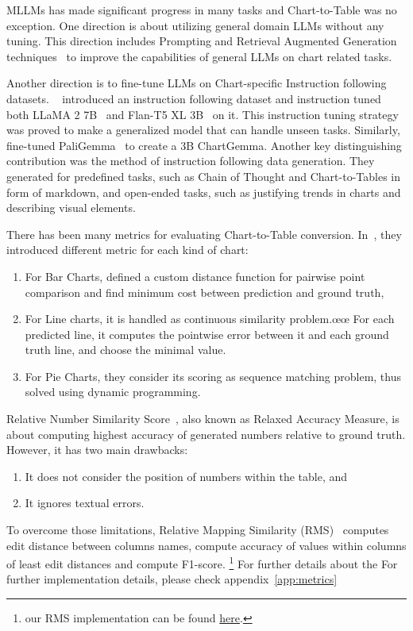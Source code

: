 \documentclass[
	letterpaper, %
]{jdf}
\begin{document}
MLLMs has made significant progress in many tasks and Chart-to-Table was no exception.
One direction is about utilizing general domain LLMs without any tuning.
This direction includes Prompting and Retrieval Augmented Generation techniques~\cite{cao2024graphinsight, voigt2023vist5} to improve the capabilities of general LLMs on chart related tasks.

Another direction is to fine-tune LLMs on Chart-specific Instruction following datasets.
~\cite{masry2024chartinstruct} introduced an instruction following dataset and instruction tuned both LLaMA 2 7B~\cite{touvron2023llama} and Flan-T5 XL 3B~\cite{chung2024scaling} on it.
This instruction tuning strategy was proved to make a generalized model that can handle unseen tasks.
Similarly,~\cite{masry2024chartgemma} fine-tuned PaliGemma~\cite{beyer2024paligemma} to create a 3B ChartGemma.
Another key distinguishing contribution was the method of instruction following data generation.
They generated for predefined tasks, such as Chain of Thought and Chart-to-Tables in form of markdown, and open-ended tasks, such as justifying trends in charts and describing visual elements.

There has been many metrics for evaluating Chart-to-Table conversion.
In~\cite{luo2021chartocr}, they introduced different metric for each kind of chart:
\begin{enumerate}
         \item For Bar Charts, defined a custom distance function for pairwise point comparison and find minimum cost between prediction and ground truth,
         \item For Line charts, it is handled as continuous similarity problem.œœ
             For each predicted line, it computes the pointwise error between it and each ground truth line, and choose the minimal value.
         \item For Pie Charts, they consider its scoring as sequence matching problem, thus solved using dynamic programming.
              \end{enumerate}
Relative Number Similarity Score~\cite{masry2022chartqa}, also known as Relaxed Accuracy Measure, is about  computing highest accuracy of generated numbers relative to ground truth.
However, it has two main drawbacks:
\begin{enumerate}
         \item It does not consider the position of numbers within the table, and
         \item It ignores textual errors.
              \end{enumerate}
To overcome those limitations, Relative Mapping Similarity (RMS)~\cite{liu2022deplot} computes edit distance between columns names, compute accuracy of values within columns of least edit distances and compute F1-score.
\footnote{our RMS implementation can be found \href{https://github.gatech.edu/mfayed8/GIE-metrics}{here}.}
For further details about the For further implementation details, please check appendix~\ref{app:metrics}
\end{document}
